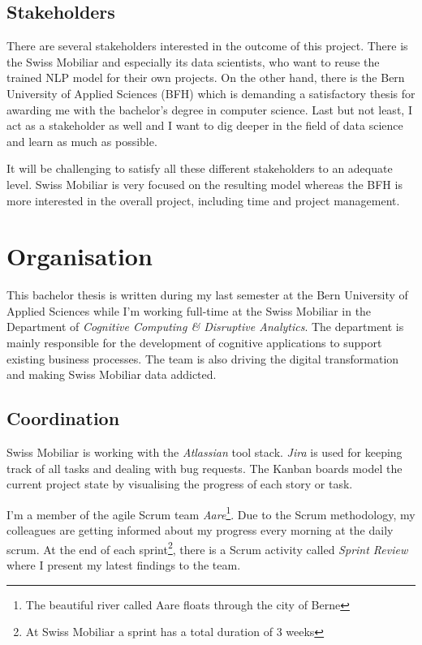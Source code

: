 \subsection{Stakeholders}

There are several stakeholders interested in the outcome of this project. There is the Swiss Mobiliar and especially its data scientists, who want to reuse the trained NLP model for their own projects. On the other hand, there is the Bern University of Applied Sciences (BFH) which is demanding a satisfactory thesis for awarding me with the bachelor's degree in computer science. Last but not least, I act as a stakeholder as well and I want to dig deeper in the field of data science and learn as much as possible.

It will be challenging to satisfy all these different stakeholders to an adequate level. Swiss Mobiliar is very focused on the resulting model whereas the BFH is more interested in the overall project, including time and project management.

\section{Organisation}

This bachelor thesis is written during my last semester at the Bern University of Applied Sciences while I'm working full-time at the Swiss Mobiliar in the Department of \emph{Cognitive Computing \& Disruptive Analytics}. The department is mainly responsible for the development of cognitive applications to support existing business processes. The team is also driving the digital transformation and making Swiss Mobiliar data addicted.

\subsection{Coordination}

Swiss Mobiliar is working with the \emph{Atlassian} tool stack. \emph{Jira} is used for keeping track of all tasks and dealing with bug requests. The Kanban boards model the current project state by visualising the progress of each story or task.

I'm a member of the agile Scrum team \emph{Aare}\footnote{The beautiful river called Aare floats through the city of Berne}. Due to the Scrum methodology, my colleagues are getting informed about my progress every morning at the daily scrum. At the end of each sprint\footnote{At Swiss Mobiliar a sprint has a total duration of 3 weeks}, there is a Scrum activity called \emph{Sprint Review} where I present my latest findings to the team.

